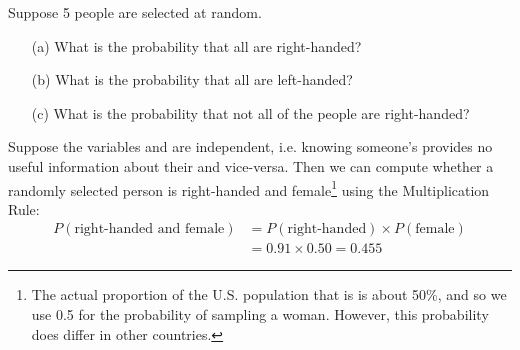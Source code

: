 \begin{exercisewrap}
\begin{nexercise}
\label{ex5Handedness}%
Suppose 5 people are selected at random.\footnotemark\vspace{-1.5mm}
\begin{enumerate}
\setlength{\itemsep}{0mm}
\item[(a)] What is the probability that all are right-handed?
\item[(b)] What is the probability that all are left-handed?
\item[(c)] What is the probability that not all of the people are right-handed?
\end{enumerate}
\end{nexercise}
\end{exercisewrap}

Suppose the variables  and  are independent, i.e. knowing someone's  provides no useful information about their  and vice-versa. Then we can compute whether a randomly selected person is right-handed and female\footnote{The actual proportion of the U.S. population that is  is about 50\%, and so we use 0.5 for the probability of sampling a woman. However, this probability does differ in other countries.} using the Multiplication Rule:
\begin{align*}
P(\text{right-handed and female})
    &= P(\text{right-handed}) \times  P(\text{female}) \\
    &= 0.91 \times  0.50 = 0.455
\end{align*}


